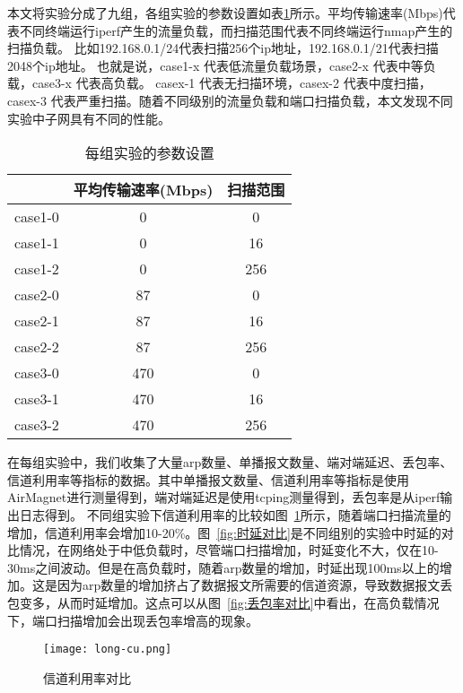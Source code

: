   本文将实验分成了九组，各组实验的参数设置如表\ref{每组实验的参数设置}所示。平均传输速率(Mbps)代表不同终端运行iperf产生的流量负载，而扫描范围代表不同终端运行nmap产生的扫描负载。 比如192.168.0.1/24代表扫描256个ip地址，192.168.0.1/21代表扫描2048个ip地址。 也就是说，case1-x 代表低流量负载场景，case2-x 代表中等负载，case3-x 代表高负载。 casex-1 代表无扫描环境，casex-2 代表中度扫描，casex-3 代表严重扫描。随着不同级别的流量负载和端口扫描负载，本文发现不同实验中子网具有不同的性能。 

\begin{table}[htb]
  \centering
  \caption{每组实验的参数设置}
  \label{每组实验的参数设置}
      \begin{tabular}{c|cc}
      \toprule  %
       &平均传输速率(Mbps)&扫描范围\\
      \hline  %
      case1-0& 0 & 0\\
      \hline %
      case1-1& 0 & 16\\
      \hline  %
      case1-2& 0 & 256\\
      \hline %
      case2-0& 87 & 0\\
      \hline %
      case2-1& 87 & 16\\
      \hline  %
      case2-2& 87 & 256\\
      \hline %
      case3-0&470 & 0\\
      \hline %
      case3-1& 470 & 16\\
      \hline  %
      case3-2& 470 & 256\\
      \bottomrule %
      \end{tabular}
\end{table}



在每组实验中，我们收集了大量arp数量、单播报文数量、端对端延迟、丢包率、信道利用率等指标的数据。其中单播报文数量、信道利用率等指标是使用AirMagnet\cite{airmagnet}进行测量得到，端对端延迟是使用tcping测量得到，丢包率是从iperf输出日志得到。
不同组实验下信道利用率的比较如图~\ref{fig:信道利用率对比}所示，随着端口扫描流量的增加，信道利用率会增加10-20\%。图~\ref{fig:时延对比}是不同组别的实验中时延的对比情况，在网络处于中低负载时，尽管端口扫描增加，时延变化不大，仅在10-30ms之间波动。但是在高负载时，随着arp数量的增加，时延出现100ms以上的增加。这是因为arp数量的增加挤占了数据报文所需要的信道资源，导致数据报文丢包变多，从而时延增加。这点可以从图~\ref{fig:丢包率对比}中看出，在高负载情况下，端口扫描增加会出现丢包率增高的现象。
\begin{figure}
  \centering
  \texttt{[image: long-cu.png]}
  \caption{信道利用率对比}
  \label{fig:信道利用率对比}
\end{figure}

